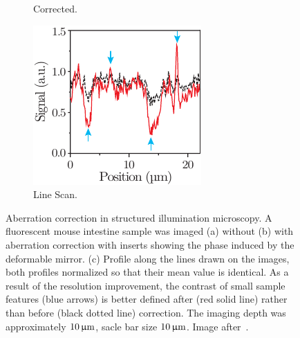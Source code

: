 \begin{figure}[htb]
\begin{subfigure}[b]{0.25\textwidth}
                \caption{Corrected.}
                \label{fig:SI_corrected}
        \end{subfigure}
        \begin{subfigure}[b]{0.25\textwidth}
                \includegraphics[width=\textwidth]{images/structured_illumination_scan}
                \caption{Line Scan.}
                \label{fig:SI_scan}
        \end{subfigure}
								
        \caption{Aberration correction in structured illumination microscopy. A fluorescent mouse intestine sample was imaged (a) without (b) with aberration correction with inserts showing the phase induced by the deformable mirror. (c) Profile along the lines drawn on the images, both profiles normalized so that their mean value is identical. As a result of the resolution improvement, the contrast of small sample features (blue arrows) is better defined after (red solid line) rather than before (black dotted line) correction. The imaging depth was approximately $\unit[10]{\upmu m}$, sacle bar size $\unit[10]{\upmu m}$. Image after~\cite{wide_AOM_structured_illu}.}
\label{fig:structured_light_correction}
\end{figure} 

